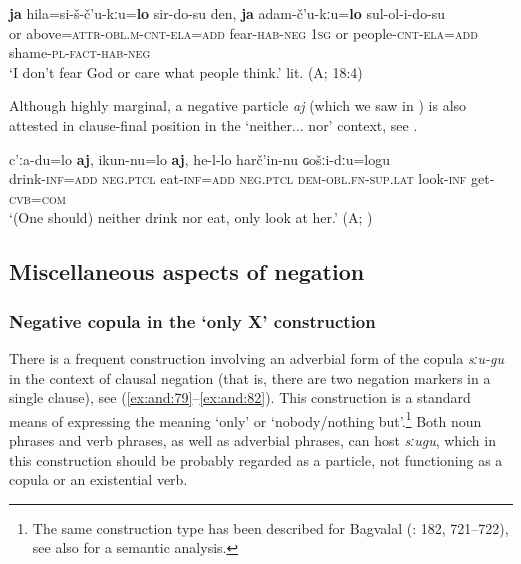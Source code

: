 \documentclass[output=paper,colorlinks=true, citecolor=brown]{langscibook}
\begin{document}
\ea
    \label{ex:and:77} 
    \gll \textbf{ja} hila=si{}-š{}-č’u{}-kːu=\textbf{lo} sir{}-do{}-su den, \textbf{ja} adam{}-č’u{}-kːu=\textbf{lo} sul{}-ol{}-i{}-do{}-su \\
          or above=\textsc{attr-obl.m-cnt-ela=add} fear-\textsc{hab-neg} \textsc{1sg} or people-\textsc{cnt-ela=add} shame{}-\textsc{pl}{}-\textsc{fact}{}-\textsc{hab-neg} \\
    \glt ‘I don’t fear God or care what people think.’ lit. (A;  18:4)
\z 

Although highly marginal, a negative particle \textit{aj} (which we saw in ) is also attested in clause-final position in the ‘neither... nor’ context, see .

\ea
    \label{ex:and:78} 
    \gll c’ːa{}-du=lo \textbf{aj}, ikun{}-nu=lo \textbf{aj}, he{}-l{}-lo harč’in{}-nu ɢošːi{}-dːu=logu \\
          drink-\textsc{inf=add} \textsc{neg.ptcl} eat-\textsc{inf=add} \textsc{neg.ptcl} \textsc{dem-obl.fn-sup.lat} look-\textsc{inf} get-\textsc{cvb=com} \\
     ‘(One should) neither drink nor eat, only look at her.’ (A; )
\z 


\subsection{Miscellaneous aspects of negation} \label{sec:and:4.6}

\subsubsection{Negative copula in the ‘only X’ construction} \label{sec:and:4.6.1}

There is a frequent construction involving an adverbial form of the copula \textit{sːu-gu} in the context of clausal negation (that is, there are two negation markers in a single clause), see (\ref{ex:and:79}--\ref{ex:and:82}). This construction is a standard means of expressing the meaning ‘only’ or ‘nobody/nothing but’.\footnote{The same construction type has been described for Bagvalal (\citealt{KibrikEtAl2001}: 182, 721–722), see also \citet{Tatevosov2021} for a semantic analysis.} Both noun phrases and verb phrases, as well as adverbial phrases, can host \textit{sːugu}, which in this construction should be probably regarded as a particle, not functioning as a copula or an existential verb.
\end{document}
